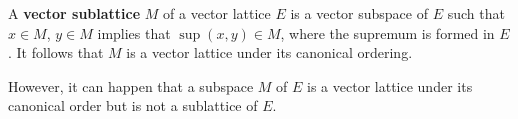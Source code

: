 A \textbf{vector sublattice} $M$ of a vector lattice $E$ is a vector subspace of $E$ such that $x \in M$, $y \in M$ implies that $\sup(x, y) \in M$, where the supremum is formed in $E$. It follows that $M$ is a vector lattice under its canonical ordering.

However, it can happen that a subspace $M$ of $E$ is a vector lattice under its canonical order but is not a sublattice of $E$.
